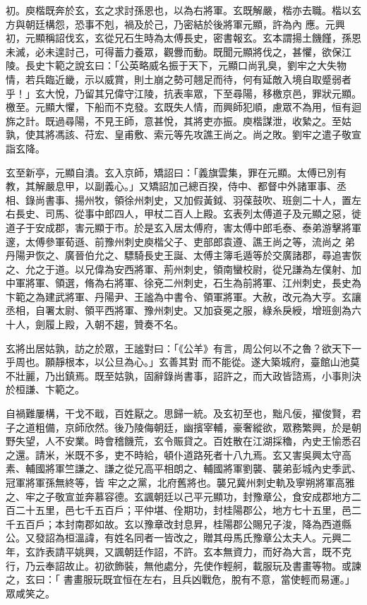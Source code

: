 \begin{pinyinscope}
 初。庾楷既奔於玄，玄之求討孫恩也，以為右將軍。玄既解嚴，楷亦去職。楷以玄方與朝廷構怨，恐事不剋，禍及於己，乃密結於後將軍元顯，許為內
 應。元興初，元顯稱詔伐玄，玄從兄石生時為太傅長史，密書報玄。玄本謂揚土饑饉，孫恩未滅，必未遑討己，可得蓄力養眾，觀釁而動。既聞元顯將伐之，甚懼，欲保江陵。長史卞範之說玄曰：「公英略威名振于天下，元顯口尚乳臭，劉牢之大失物情，若兵臨近畿，示以威賞，則土崩之勢可翹足而待，何有延敵入境自取蹙弱者乎！」玄大悅，乃留其兄偉守江陵，抗表率眾，下至尋陽，移檄京邑，罪狀元顯。檄至。元顯大懼，下船而不克發。玄既失人情，而興師犯順，慮眾不為用，恒有迴旆之計。既過尋陽，不見王師，意甚悅，其將吏亦振。庾楷謀泄，收縶之。至姑
 孰，使其將馮該、苻宏、皇甫敷、索元等先攻譙王尚之。尚之敗。劉牢之遣子敬宣詣玄降。



 玄至新亭，元顯自潰。玄入京師，矯詔曰：「義旗雲集，罪在元顯。太傅已別有教，其解嚴息甲，以副義心。」又矯詔加己總百揆，侍中、都督中外諸軍事、丞相、錄尚書事、揚州牧，領徐州刺史，又加假黃鉞、羽葆鼓吹、班劍二十人，置左右長史、司馬、從事中郎四人，甲杖二百人上殿。玄表列太傅道子及元顯之惡，徙道子于安成郡，害元顯于市。於是玄入居太傅府，害太傅中郎毛泰、泰弟游擊將軍邃，太傅參軍荀遜、前豫州刺史庾楷父子、吏部郎袁遵、譙王尚之等，流尚之
 弟丹陽尹恢之、廣晉伯允之、驃騎長史王誕、太傅主簿毛遁等於交廣諸郡，尋追害恢之、允之于道。以兄偉為安西將軍、荊州刺史，領南蠻校尉，從兄謙為左僕射、加中軍將軍、領選，脩為右將軍、徐兗二州刺史，石生為前將軍、江州刺史，長史為卞範之為建武將軍、丹陽尹、王謐為中書令、領軍將軍。大赦，改元為大亨。玄讓丞相，自署太尉、領平西將軍、豫州刺史。又加袞冕之服，綠糸戾綬，增班劍為六十人，劍履上殿，入朝不趨，贊奏不名。



 玄將出居姑孰，訪之於眾，王謐對曰：「《公羊》有言，周公何以不之魯？欲天下一乎周也。願靜根本，以公旦為心。」玄善其對
 而不能從。遂大築城府，臺館山池莫不壯麗，乃出鎮焉。既至姑孰，固辭錄尚書事，詔許之，而大政皆諮焉，小事則決於桓謙、卞範之。



 自禍難屢構，干戈不戢，百姓厭之。思歸一統。及玄初至也，黜凡佞，擢俊賢，君子之道粗備，京師欣然。後乃陵侮朝廷，幽擯宰輔，豪奢縱欲，眾務繁興，於是朝野失望，人不安業。時會稽饑荒，玄令賑貸之。百姓散在江湖採穭，內史王愉悉召之還。請米，米既不多，吏不時給，頓仆道路死者十八九焉。玄又害吳興太守高素、輔國將軍竺謙之、謙之從兄高平相朗之、輔國將軍劉襲、襲弟彭城內史季武、冠軍將軍孫無終等，皆
 牢之之黨，北府舊將也。襲兄冀州刺史軌及寧朔將軍高雅之、牢之子敬宣並奔慕容德。玄諷朝廷以己平元顯功，封豫章公，食安成郡地方二百二十五里，邑七千五百戶；平仲堪、佺期功，封桂陽郡公，地方七十五里，邑二千五百戶；本封南郡如故。玄以豫章改封息昇，桂陽郡公賜兄子浚，降為西道縣公。又發詔為桓溫諱，有姓名同者一皆改之，贈其母馬氏豫章公太夫人。元興二年，玄詐表請平姚興，又諷朝廷作詔，不許。玄本無資力，而好為大言，既不克行，乃云奉詔故止。初欲飾裝，無他處分，先使作輕舸，載服玩及書畫等物。或諫之，玄曰：「
 書畫服玩既宜恒在左右，且兵凶戰危，脫有不意，當使輕而易運。」眾咸笑之。




\end{pinyinscope}
